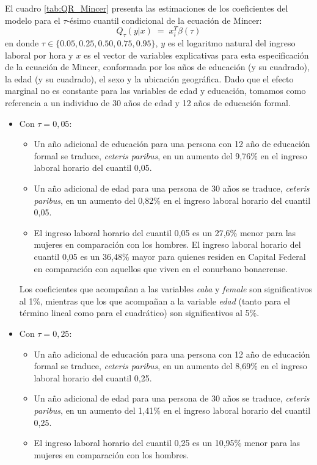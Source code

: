 \documentclass[12pt]{article}
\begin{document}
El cuadro \ref{tab:QR_Mincer} presenta las estimaciones de los coeficientes del modelo para el $\tau$-ésimo cuantil condicional de la ecuación de Mincer:
\[
Q_{\tau}(y|x)\;=\;x_{i}^{T}\beta(\tau)
\]
en donde $\tau\in\{0.05,0.25,0.50,0.75,0.95\}$, $y$ es el logaritmo natural del ingreso laboral por hora y $x$ es el vector de variables explicativas para esta especificación de la ecuación de Mincer, conformada por los años de educación (y su cuadrado), la edad (y su cuadrado), el sexo y la ubicación geográfica. Dado que el efecto marginal no es constante para las variables de edad y educación, tomamos como referencia a un individuo de 30 años de edad y 12 años de educación formal.
\begin{itemize}
    \item Con $\tau=0,05$:
    \begin{itemize}
        \item Un año adicional de educación para una persona con 12 año de educación formal se traduce, \emph{ceteris paribus}, en un aumento del 9,76\% en el ingreso laboral horario del cuantil 0,05.
        \item Un año adicional de edad para una persona de 30 años se traduce, \emph{ceteris paribus}, en un aumento del 0,82\% en el ingreso laboral horario del cuantil 0,05.
        \item El ingreso laboral horario del cuantil 0,05 es un 27,6\% menor para las mujeres en comparación con los hombres.
        El ingreso laboral horario del cuantil 0,05 es un 36,48\% mayor para quienes residen en Capital Federal en comparación con aquellos que viven en el conurbano bonaerense.
    \end{itemize}
    Los coeficientes que acompañan a las variables \emph{caba} y \emph{female} son significativos al 1\%, mientras que los que acompañan a la variable \emph{edad} (tanto para el término lineal como para el cuadrático) son significativos al 5\%.
    \item Con $\tau=0,25$:
    \begin{itemize}
        \item Un año adicional de educación para una persona con 12 año de educación formal se traduce, \emph{ceteris paribus}, en un aumento del 8,69\% en el ingreso laboral horario del cuantil 0,25.
        \item Un año adicional de edad para una persona de 30 años se traduce, \emph{ceteris paribus}, en un aumento del 1,41\% en el ingreso laboral horario del cuantil 0,25.
        \item El ingreso laboral horario del cuantil 0,25 es un 10,95\% menor para las mujeres en comparación con los hombres.

\end{itemize}
\end{itemize}
\end{document}

